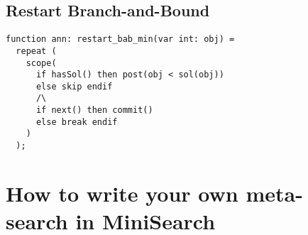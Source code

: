 \documentclass[a4paper,13pt,onecolumn]{article}%
\begin{document}
\subsection{Restart Branch-and-Bound}

\begin{lstlisting}
function ann: restart_bab_min(var int: obj) =
  repeat (
    scope(
      if hasSol() then post(obj < sol(obj)) 
      else skip endif
      /\ 
      if next() then commit()
      else break endif
    )
  );
\end{lstlisting}


\section{How to write your own meta-search in MiniSearch}
\label{sec:ownsearch}
\end{document}
